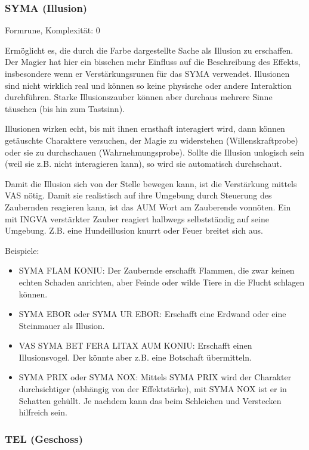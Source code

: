 \documentclass{article}
\begin{document}
\subsubsection{SYMA (Illusion)}

Formrune, Komplexität: 0

Ermöglicht es, die durch die Farbe dargestellte Sache als Illusion zu erschaffen. Der Magier hat hier ein bisschen mehr
Einfluss auf die Beschreibung des Effekts, insbesondere wenn er Verstärkungsrunen für das SYMA verwendet.
Illusionen sind nicht wirklich real und können so keine physische oder andere Interaktion durchführen. Starke
Illusionszauber können aber durchaus mehrere Sinne täuschen (bis hin zum Tastsinn).

Illusionen wirken echt, bis mit ihnen ernsthaft interagiert wird, dann können getäuschte Charaktere versuchen, der
Magie zu widerstehen (Willenskraftprobe) oder sie zu durchschauen (Wahrnehmungsprobe). Sollte die Illusion unlogisch
sein (weil sie z.B. nicht interagieren kann), so wird sie automatisch durchschaut.

Damit die Illusion sich von der Stelle bewegen kann, ist die Verstärkung mittels VAS nötig. Damit sie realistisch auf
ihre Umgebung durch Steuerung des Zaubernden reagieren kann, ist das AUM Wort am Zauberende vonnöten. Ein mit INGVA
verstärkter Zauber reagiert halbwegs selbstständig auf seine Umgebung. Z.B. eine Hundeillusion knurrt oder Feuer
breitet sich aus.

Beispiele:

\begin{itemize}
\item SYMA FLAM KONIU: Der Zaubernde erschafft Flammen, die zwar keinen echten Schaden anrichten, aber Feinde oder wilde Tiere in die Flucht schlagen können.
\item SYMA EBOR oder SYMA UR EBOR: Erschafft eine Erdwand oder eine Steinmauer als Illusion.
\item VAS SYMA BET FERA LITAX AUM KONIU: Erschafft einen Illusionsvogel. Der könnte aber z.B. eine Botschaft übermitteln.
\item SYMA PRIX oder SYMA NOX: Mittels SYMA PRIX wird der Charakter durchsichtiger (abhängig von der Effektstärke), mit SYMA NOX ist er in Schatten gehüllt. Je nachdem kann das beim Schleichen und Verstecken hilfreich sein.
\end{itemize}

\subsubsection{TEL (Geschoss)}
\end{document}
